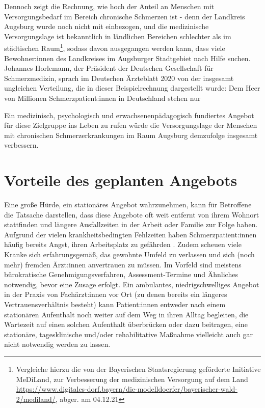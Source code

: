 \documentclass[
  twoside,
  parskip=half-,
  paper=176mm:246mm,
  BCOR=14mm,
  DIV=14,
]{scrreprt}
\begin{document}
Dennoch zeigt die Rechnung, wie hoch der Anteil an Menschen mit Versorgungsbedarf im Bereich chronische Schmerzen ist - denn der Landkreis Augsburg wurde noch nicht mit einbezogen, und die medizinische Versorgungslage ist bekanntlich in ländlichen Bereichen schlechter als im städtischen Raum\footnote{Vergleiche hierzu die von der Bayerischen Staatsregierung geförderte Initiative MeDiLand, zur Verbesserung der medizinischen Versorgung auf dem Land \url{https://www.digitales-dorf.bayern/die-modelldoerfer/bayerischer-wald-2/mediland/}, abger. am 04.12.21}, sodass davon ausgegangen werden kann, dass viele Bewohner:innen des Landkreises im Augsburger Stadtgebiet nach Hilfe suchen. Johannes Horlemann, der Präsident der Deutschen Gesellschaft für Schmerzmedizin, sprach im Deutschen Ärzteblatt 2020 von der insgesamt ungleichen Verteilung, die in dieser Beispielrechnung dargestellt wurde: Dem Heer von Millionen Schmerzpatient:innen in Deutschland stehen nur 

Ein medizinisch, psychologisch und erwachsenenpädagogisch fundiertes Angebot für diese Zielgruppe ins Leben zu rufen würde die Versorgungslage der Menschen mit chronischen Schmerzerkrankungen im Raum Augsburg demzufolge insgesamt verbessern.

\section{Vorteile des geplanten Angebots}

Eine große Hürde, ein stationäres Angebot wahrzunehmen, kann für Betroffene die Tatsache darstellen, dass diese Angebote oft weit entfernt von ihrem Wohnort stattfinden und längere Ausfallzeiten in der Arbeit oder Familie zur Folge haben. Aufgrund der vielen krankheitsbedingten Fehlzeiten haben Schmerzpatient:innen häufig bereits Angst, ihren Arbeitsplatz zu gefährden \autocite[vgl.][372]{fussnegger}. Zudem scheuen viele Kranke sich erfahrungsgemäß, das gewohnte Umfeld zu verlassen und sich (noch mehr) fremden Ärzt:innen anvertrauen zu müssen. Im Vorfeld sind meistens bürokratische Genehmigungsverfahren, Assessment-Termine und Ähnliches notwendig, bevor eine Zusage erfolgt. Ein ambulantes, niedrigschwelliges Angebot in der Praxis von Fachärzt:innen vor Ort (zu denen bereits ein längeres Vertrauensverhältnis besteht) kann Patient:innen entweder nach einem stationären Aufenthalt noch weiter auf dem Weg in ihren Alltag begleiten, die Wartezeit auf einen solchen Aufenthalt überbrücken oder dazu beitragen, eine stationäre, tagesklinische und/oder rehabilitative Maßnahme vielleicht auch gar nicht notwendig werden zu lassen.
\end{document}
